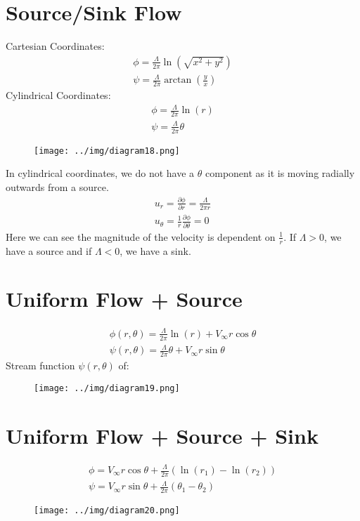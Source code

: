 \documentclass[class=report, crop=false, 12pt,a4paper]{standalone}
\begin{document}
\section{Source/Sink Flow}
Cartesian Coordinates:
\begin{gather}
  \phi = \frac{\Lambda}{2\pi} \ln(\sqrt{x^2 +y^2})\\
  \psi = \frac{\Lambda}{2\pi}\arctan\left(\frac{y}{x}\right)
\end{gather}
Cylindrical Coordinates:
\begin{gather}
  \phi = \frac{\Lambda}{2\pi}\ln(r)\\
  \psi = \frac{\Lambda}{2\pi}\theta
\end{gather}
\begin{figure}[H]
  \centering
  \texttt{[image: ../img/diagram18.png]}
\end{figure}
In cylindrical coordinates, we do not have a $\theta$ component as it is moving radially outwards from a source.
\begin{gather}
  u_r = \frac{\partial \phi}{\partial r} = \frac{\Lambda}{2\pi r}\\
  u_{\theta} = \frac{1}{r} \frac{\partial \phi}{\partial \theta} = 0
\end{gather}
Here we can see the magnitude of the velocity is dependent on $\frac{1}{r}$. If $\Lambda > 0$, we have a source and if $\Lambda < 0$, we have a sink.
\section{Uniform Flow + Source}
\begin{gather}
  \phi (r,\theta) = \frac{\Lambda}{2\pi} \ln(r) + V_{\infty} r \cos \theta \\
  \psi (r,\theta) = \frac{\Lambda}{2\pi}\theta + V_{\infty} r \sin \theta
\end{gather}
Stream function $\psi (r,\theta)$ of:
\begin{figure}[H]
  \centering
  \texttt{[image: ../img/diagram19.png]}
\end{figure}
\section{Uniform Flow + Source + Sink}
\begin{gather}
  \phi = V_{\infty} r \cos \theta + \frac{\Lambda}{2\pi}(\ln (r_1) - \ln (r_2))\\
  \psi = V_{\infty} r \sin \theta + \frac{\Lambda}{2\pi} (\theta_1 - \theta_2)
\end{gather}
\begin{figure}[H]
  \centering
  \texttt{[image: ../img/diagram20.png]}
\end{figure}
\end{document}
